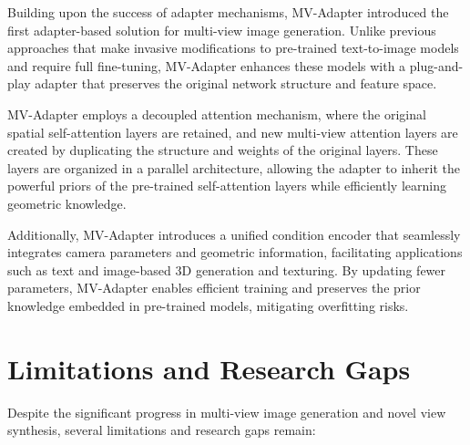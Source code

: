 Building upon the success of adapter mechanisms, MV-Adapter \cite{mvadapter} introduced the first adapter-based solution for multi-view image generation. Unlike previous approaches that make invasive modifications to pre-trained text-to-image models and require full fine-tuning, MV-Adapter enhances these models with a plug-and-play adapter that preserves the original network structure and feature space.

MV-Adapter employs a decoupled attention mechanism, where the original spatial self-attention layers are retained, and new multi-view attention layers are created by duplicating the structure and weights of the original layers. These layers are organized in a parallel architecture, allowing the adapter to inherit the powerful priors of the pre-trained self-attention layers while efficiently learning geometric knowledge.

Additionally, MV-Adapter introduces a unified condition encoder that seamlessly integrates camera parameters and geometric information, facilitating applications such as text and image-based 3D generation and texturing. By updating fewer parameters, MV-Adapter enables efficient training and preserves the prior knowledge embedded in pre-trained models, mitigating overfitting risks.


\section{Limitations and Research Gaps}\label{sec:limitations}

Despite the significant progress in multi-view image generation and novel view synthesis, several limitations and research gaps remain:

